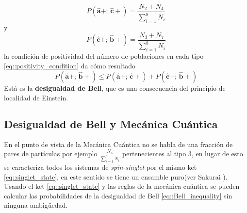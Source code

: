 \documentclass[a4paper]{article}
\begin{document}
\begin{equation}
P(\mathbf{\hat{a}}+;\, \mathbf{\hat{c}}+) = \frac{N_2+N_4}{\sum_{i=1}^{8} N_i} 
\end{equation}
y
\begin{equation}
P(\mathbf{\hat{c}}+;\, \mathbf{\hat{b}} +) = \frac{N_3+N_7}{\sum_{i=1}^{8} N_i} 
\end{equation}
la condición de positividad del número de poblaciones en cada tipo \ref{eq::positivity_condition} da cómo resultado
\begin{equation}\label{eq::Bell_inequality}
P(\mathbf{\hat{a}}+;\, \mathbf{\hat{b}} +) \leq P(\mathbf{\hat{a}}+;\, \mathbf{\hat{c}} +) + P(\mathbf{\hat{c}}+;\, \mathbf{\hat{b}} +)  
\end{equation}
Está es la \textbf{desigualdad de Bell}, que es una consecuencia del principio de localidad de Einstein.

\subsection{Desigualdad de Bell y Mecánica Cuántica}
En el punto de vista de la Mecánica Cuántica no se habla de una fracción de pares de partículas por ejemplo $\frac{N_3}{\sum_{i=1}^{8} N_i}$ pertenecientes al tipo 3, en lugar de esto se caracteriza todos los sistemas de \textit{spin-singlet} por el mismo ket \ref{eq::singlet_state}, en este sentido se tiene un ensamble puro(ver Sakurai \cite{Sakurai}). Usando el ket \ref{eq::singlet_state} y las reglas de la mecánica cuántica se pueden calcular las probabilidades de la desigualdad de Bell \ref{eq::Bell_inequality} sin ninguna ambigüedad.\\
\end{document}
